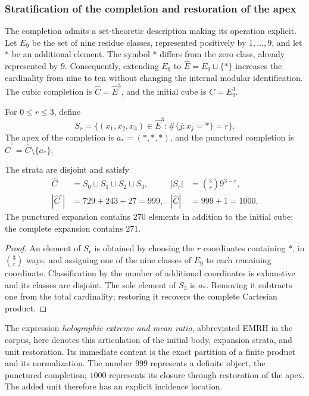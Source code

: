 \subsubsection{Stratification of the completion and restoration of the apex}
\label{sec:revision-emrh}

The completion admits a set-theoretic description making its operation
explicit. Let \(E_9\) be the set of nine residue classes, represented
positively by \(1,\ldots,9\), and let \(\ast\) be an additional element.
The symbol \(\ast\) differs from the zero class, already represented by \(9\).
Consequently, extending \(E_9\) to
\(\widehat E=E_9\sqcup\{\ast\}\) increases the cardinality from nine
to ten without changing the internal modular identification. The cubic
completion is \(\widehat C=\widehat E^3\), and the initial cube is \(C=E_9^3\).

\begin{definition}
For \(0\leq r\leq3\), define
\[
 S_r=\{(x_1,x_2,x_3)\in\widehat E^3:
             \#\{j:x_j=\ast\}=r\}.
\]
The apex of the completion is \(a_\ast=(\ast,\ast,\ast)\), and the
punctured completion is \(\widehat C^{\circ}=\widehat C\setminus\{a_\ast\}\).
\end{definition}

\begin{proposition}
The strata are disjoint and satisfy
\begin{align}
 \widehat C&=S_0\sqcup S_1\sqcup S_2\sqcup S_3,
 &|S_r|&=\binom3r9^{3-r},\label{eq:revision-estratos}\\
 |\widehat C^{\circ}|&=729+243+27=999,
 &|\widehat C|&=999+1=1000.\label{eq:revision-999}
\end{align}
The punctured expansion contains \(270\) elements in addition to the
initial cube; the complete expansion contains \(271\).
\end{proposition}
\begin{proof}
An element of \(S_r\) is obtained by choosing the \(r\) coordinates
containing \(\ast\), in \(\binom3r\) ways, and assigning one of the
nine classes of \(E_9\) to each remaining coordinate. Classification by
the number of additional coordinates is exhaustive and its classes are
disjoint. The sole element of \(S_3\) is \(a_\ast\). Removing it
subtracts one from the total cardinality; restoring it recovers the
complete Cartesian product.
\end{proof}

The expression \emph{holographic extreme and mean ratio}, abbreviated EMRH
in the corpus, here denotes this articulation of the initial body, expansion
strata, and unit restoration. Its immediate content is the exact partition
of a finite product and its normalization. The number \(999\) represents
a definite object, the punctured completion; \(1000\) represents its
closure through restoration of the apex. The added unit therefore has
an explicit incidence location.

